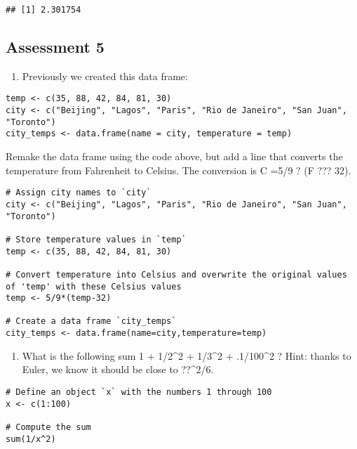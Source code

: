 \documentclass[
]{article}
\providecommand{\tightlist}{%
  \setlength{\itemsep}{0pt}\setlength{\parskip}{0pt}}
\begin{document}
\begin{verbatim}
## [1] 2.301754
\end{verbatim}

\hypertarget{assessment-5}{%
\subsection{Assessment 5}\label{assessment-5}}

\begin{enumerate}
\def\labelenumi{\arabic{enumi}.}
\tightlist
\item
  Previously we created this data frame:
\end{enumerate}

\begin{verbatim}
temp <- c(35, 88, 42, 84, 81, 30)
city <- c("Beijing", "Lagos", "Paris", "Rio de Janeiro", "San Juan", "Toronto")
city_temps <- data.frame(name = city, temperature = temp)
\end{verbatim}

Remake the data frame using the code above, but add a line that converts
the temperature from Fahrenheit to Celsius. The conversion is C =5/9 ?
(F ??? 32).

\begin{verbatim}
# Assign city names to `city` 
city <- c("Beijing", "Lagos", "Paris", "Rio de Janeiro", "San Juan", "Toronto")

# Store temperature values in `temp`
temp <- c(35, 88, 42, 84, 81, 30)

# Convert temperature into Celsius and overwrite the original values of 'temp' with these Celsius values
temp <- 5/9*(temp-32)

# Create a data frame `city_temps` 
city_temps <- data.frame(name=city,temperature=temp)
\end{verbatim}

\begin{enumerate}
\def\labelenumi{\arabic{enumi}.}
\setcounter{enumi}{1}
\tightlist
\item
  What is the following sum 1 + 1/2\^{}2 + 1/3\^{}2 + .1/100\^{}2 ?
  Hint: thanks to Euler, we know it should be close to ??\^{}2/6.
\end{enumerate}

\begin{verbatim}
# Define an object `x` with the numbers 1 through 100
x <- c(1:100)

# Compute the sum 
sum(1/x^2)
\end{verbatim}
\end{document}
